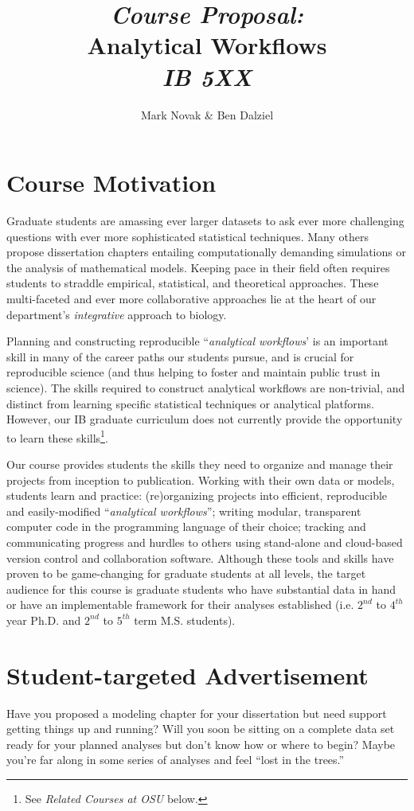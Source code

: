 \documentclass[10pt]{article}
\author{Mark Novak \& Ben Dalziel}
\title{\emph{Course Proposal:}\\Analytical Workflows\\\emph{IB 5XX}}
\date{}
\begin{document}
\maketitle

\section*{Course Motivation}
Graduate students are amassing ever larger datasets to ask ever more challenging questions with ever 
more sophisticated  statistical techniques. 
Many others propose dissertation chapters entailing computationally demanding simulations or the 
analysis of mathematical models. 
Keeping pace in their field often requires students to straddle empirical, statistical, and theoretical 
approaches. 
These multi-faceted and ever more collaborative approaches lie at the heart of our 
department's \emph{integrative} approach to biology.

Planning and constructing reproducible ``\emph{analytical workflows}' is an important skill in many of the career paths our students pursue, and is crucial for reproducible science (and thus helping to foster and maintain public trust in science). 
The skills required to construct analytical workflows are non-trivial, and distinct from learning specific statistical techniques or analytical platforms. 
However, our IB graduate curriculum does not currently provide the opportunity to learn these skills\footnote{See \emph{Related Courses at OSU} below.}. 

Our course provides students the skills they need to organize and manage their projects from 
inception to publication.  
Working with their own data or models, students learn and practice: (re)organizing projects into 
efficient, reproducible and easily-modified ``\emph{analytical workflows}''; 
writing modular, transparent computer code in the programming language of their choice;
tracking and communicating progress and hurdles to others using stand-alone and cloud-based version 
control and collaboration software.
Although these tools and skills have proven to be game-changing for graduate students at all levels, the 
target audience for this course is graduate students who have substantial data in hand or have an 
implementable framework for their analyses established (i.e. $2^{nd}$ to $4^{th}$ year Ph.D. and 
$2^{nd}$ to $5^{th}$ term M.S. students).

\section*{Student-targeted Advertisement}
Have you proposed a modeling chapter for your dissertation but need support getting things up and 
running?  
Will you soon be sitting on a complete data set ready for your planned analyses but don't know how or 
where to begin?
Maybe you're far along in some series of analyses and feel ``lost in the trees.''
\end{document}
